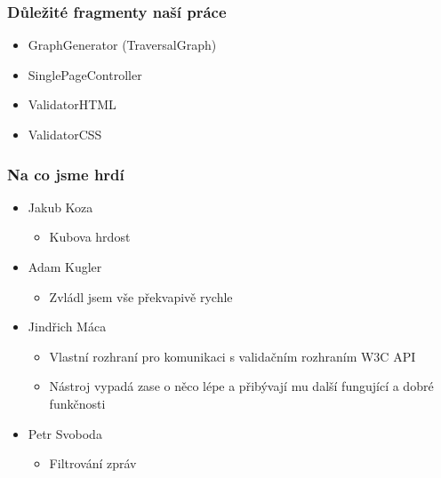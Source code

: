 \documentclass{beamer}
\begin{document}
\begin{frame}[allowframebreaks]\frametitle{Důležité fragmenty naší práce}
  \begin{itemize}
    \item GraphGenerator (TraversalGraph)
		\item SinglePageController
		\item ValidatorHTML
		\item ValidatorCSS
  \end{itemize}
\end{frame}

\begin{frame}[allowframebreaks]\frametitle{Na co jsme hrdí} 
  \begin{itemize}
    \item Jakub Koza
      \begin{itemize}
       \item Kubova hrdost
     \end{itemize}
   
    \item Adam Kugler
      \begin{itemize}
       \item Zvládl jsem vše překvapivě rychle
     \end{itemize}

    \item Jindřich Máca
      \begin{itemize}
       \item Vlastní rozhraní pro komunikaci s validačním rozhraním W3C API
			 \item Nástroj vypadá zase o něco lépe a přibývají mu další fungující a dobré funkčnosti
      \end{itemize}  
   
    \item Petr Svoboda
      \begin{itemize}
       \item Filtrování zpráv
     \end{itemize}
   \end{itemize}  
\end{frame}
\end{document}

